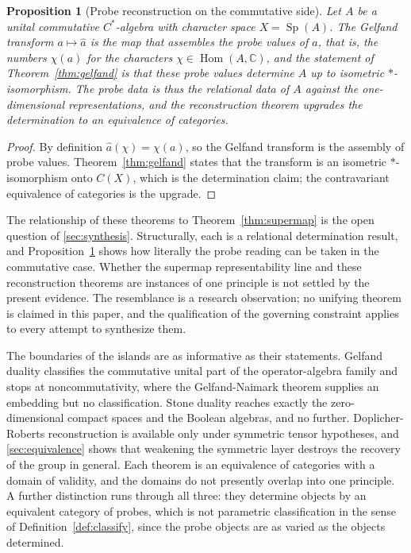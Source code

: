\documentclass[11pt,letterpaper]{article}
\DeclareMathOperator{\Hom}{Hom}
\DeclareMathOperator{\Sp}{Sp}
\newtheorem{proposition}[theorem]{Proposition}
\theoremstyle{definition}
\theoremstyle{remark}
\begin{document}
\begin{proposition}[Probe reconstruction on the commutative side]
\label{prop:commprobe}
Let $A$ be a unital commutative $C^*$-algebra with character space $X = \Sp(A)$. The Gelfand transform $a \mapsto \hat{a}$ is the map that assembles the probe values of $a$, that is, the numbers $\chi(a)$ for the characters $\chi \in \Hom(A, \mathbb{C})$, and the statement of Theorem~\ref{thm:gelfand} is that these probe values determine $A$ up to isometric $*$-isomorphism. The probe data is thus the relational data of $A$ against the one-dimensional representations, and the reconstruction theorem upgrades the determination to an equivalence of categories.
\end{proposition}

\begin{proof}
By definition $\hat{a}(\chi) = \chi(a)$, so the Gelfand transform is the assembly of probe values. Theorem~\ref{thm:gelfand} states that the transform is an isometric $*$-isomorphism onto $C(X)$, which is the determination claim; the contravariant equivalence of categories is the upgrade.
\end{proof}

The relationship of these theorems to Theorem~\ref{thm:supermap} is the open question of \cref{sec:synthesis}. Structurally, each is a relational determination result, and Proposition~\ref{prop:commprobe} shows how literally the probe reading can be taken in the commutative case. Whether the supermap representability line and these reconstruction theorems are instances of one principle is not settled by the present evidence. The resemblance is a research observation; no unifying theorem is claimed in this paper, and the qualification of the governing constraint applies to every attempt to synthesize them.

The boundaries of the islands are as informative as their statements. Gelfand duality classifies the commutative unital part of the operator-algebra family and stops at noncommutativity, where the Gelfand-Naimark theorem supplies an embedding but no classification. Stone duality reaches exactly the zero-dimensional compact spaces and the Boolean algebras, and no further. Doplicher-Roberts reconstruction is available only under symmetric tensor hypotheses, and \cref{sec:equivalence} shows that weakening the symmetric layer destroys the recovery of the group in general. Each theorem is an equivalence of categories with a domain of validity, and the domains do not presently overlap into one principle. A further distinction runs through all three: they determine objects by an equivalent category of probes, which is not parametric classification in the sense of Definition~\ref{def:classify}, since the probe objects are as varied as the objects determined.
\end{document}
